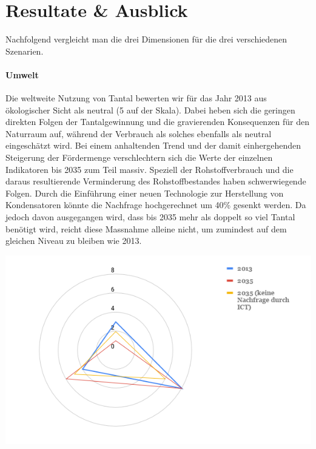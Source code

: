 \section{Resultate \& Ausblick}\label{sec:conflict}

Nachfolgend vergleicht man die drei Dimensionen für die drei verschiedenen Szenarien.

\paragraph{Umwelt}
Die weltweite Nutzung von Tantal bewerten wir für das Jahr 2013 aus ökologischer
Sicht als neutral (5 auf der Skala). Dabei heben sich die geringen direkten
Folgen der Tantalgewinnung und die gravierenden Konsequenzen für den Naturraum
auf, während der Verbrauch als solches ebenfalls als neutral eingeschätzt wird.
Bei einem anhaltenden Trend und der damit einhergehenden Steigerung der
Fördermenge verschlechtern sich die Werte der einzelnen Indikatoren bis 2035 zum
Teil massiv. Speziell der Rohstoffverbrauch und die daraus resultierende
Verminderung des Rohstoffbestandes haben schwerwiegende Folgen. Durch die
Einführung einer neuen Technologie zur Herstellung von Kondensatoren könnte die
Nachfrage hochgerechnet um 40\% gesenkt werden. Da jedoch davon ausgegangen
wird, dass bis 2035 mehr als doppelt so viel Tantal benötigt wird, reicht
diese Massnahme alleine nicht, um zumindest auf dem gleichen Niveau zu bleiben
wie 2013. 
\begin{center}
\includegraphics[width=14cm]{images/tantal-results}
\end{center}
